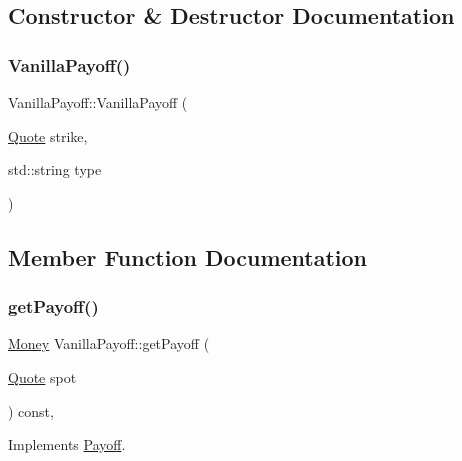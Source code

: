 \subsection{Constructor \& Destructor Documentation}
\hypertarget{class_vanilla_payoff_ae0d7f1fdb70f4ad9c2002f96df2199d3}{}\label{class_vanilla_payoff_ae0d7f1fdb70f4ad9c2002f96df2199d3} 
\subsubsection{\texorpdfstring{Vanilla\+Payoff()}{VanillaPayoff()}}
{\footnotesize\ttfamily Vanilla\+Payoff\+::\+Vanilla\+Payoff (\begin{DoxyParamCaption}\item[{\hyperlink{_name_def_8h_a642a6c5fd87319d922637de0e0bb0305}{Quote}}]{strike,  }\item[{std\+::string}]{type }\end{DoxyParamCaption})}



\subsection{Member Function Documentation}
\hypertarget{class_vanilla_payoff_aa141f5b29c30d54448c93a21bef83bb3}{}\label{class_vanilla_payoff_aa141f5b29c30d54448c93a21bef83bb3} 
\subsubsection{\texorpdfstring{get\+Payoff()}{getPayoff()}}
{\footnotesize\ttfamily \hyperlink{_name_def_8h_a5a9d48c16a694e9a2d9f1eca730dc8c5}{Money} Vanilla\+Payoff\+::get\+Payoff (\begin{DoxyParamCaption}\item[{\hyperlink{_name_def_8h_a642a6c5fd87319d922637de0e0bb0305}{Quote}}]{spot }\end{DoxyParamCaption}) const\hspace{0.3cm}{\ttfamily [override]}, {\ttfamily [virtual]}}



Implements \hyperlink{class_payoff_a908e732330294a111345b4183ddb025b}{Payoff}.

\hypertarget{class_vanilla_payoff_ae99fb31f1496f723ec598367ece825e3}{}\label{class_vanilla_payoff_ae99fb31f1496f723ec598367ece825e3} 
